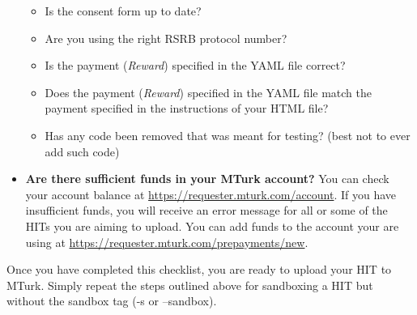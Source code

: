 \documentclass{article}
\begin{document}
\begin{tcolorbox}[colback=gray!5,colframe=blue!40!black,title=Final checklist]
\begin{itemize}
\begin{itemize}
        \item Is the consent form up to date?
        \item Are you using the right RSRB protocol number?
        \item Is the payment ({\em Reward}) specified in the YAML file correct?
        \item Does the payment ({\em Reward}) specified in the YAML file match the payment specified in the instructions of your HTML file?
        \item Has any code been removed that was meant for testing? (best not to ever add such code)
    \end{itemize}
    \item {\bf Are there sufficient funds in your MTurk account?}  You can check your account balance at \url{https://requester.mturk.com/account}. If you have insufficient funds, you will receive an error message for all or some of the HITs you are aiming to upload. You can add funds to the account your are using at \url{https://requester.mturk.com/prepayments/new}.
\end{itemize}
\end{tcolorbox}

Once you have completed this checklist, you are ready to upload your HIT to MTurk. Simply repeat the steps outlined above for sandboxing a HIT but without the sandbox tag (-s or --sandbox).


\end{document}
